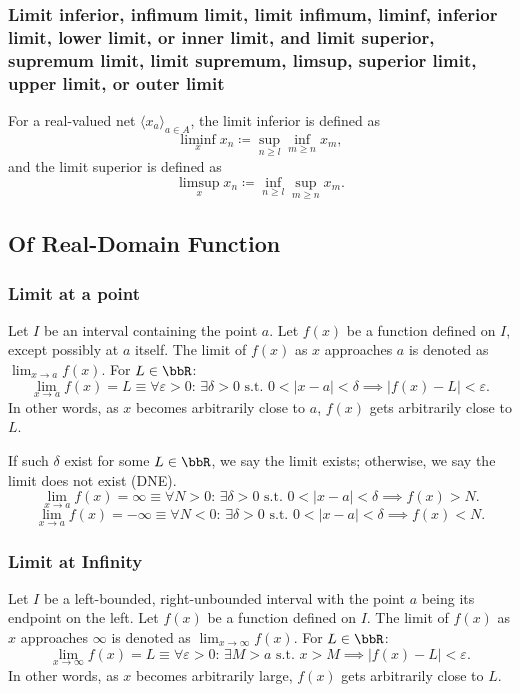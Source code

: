 \subsubsection{Limit inferior, infimum limit, limit infimum, liminf, inferior limit, lower limit, or inner limit, and limit superior, supremum limit, limit supremum, limsup, superior limit, upper limit, or outer limit}
For a real-valued net $\langle x_a\rangle_{a\in A}$, the limit inferior is defined as
\[\liminf_{x}x_n\coloneq\sup_{n\geq l}\inf_{m\geq n}x_m,\]
and the limit superior is defined as
\[\limsup_{x}x_n\coloneq\inf_{n\geq l}\sup_{m\geq n}x_m.\]
\subsection{Of Real-Domain Function}
\subsubsection{Limit at a point}
Let \(I\) be an interval containing the point \(a\). Let \( f(x) \) be a function defined on \(I\), except possibly at \(a\) itself. The limit of \( f(x) \) as \( x \) approaches \( a \) is denoted as $\lim_{x \to a} f(x)$. For $L\in\bbR$:
\[\lim_{x \to a} f(x) = L \equiv \forall \varepsilon > 0:\, \exists \delta > 0 \text{\ s.t.\ } 0 < |x - a| < \delta \implies |f(x) - L| < \varepsilon.\]
In other words, as \(x\) becomes arbitrarily close to \(a\), \(f(x)\) gets arbitrarily close to \(L\).

If such $\delta$ exist for some $L\in\bbR$, we say the limit exists; otherwise, we say the limit does not exist (DNE).
\[\lim_{x\to a}f(x)=\infty \equiv \forall N > 0:\, \exists \delta > 0 \text{\ s.t.\ } 0 < |x - a| < \delta \implies f(x) > N.\]
\[\lim_{x\to a}f(x)=-\infty \equiv \forall N < 0:\, \exists \delta > 0 \text{\ s.t.\ } 0 < |x - a| < \delta \implies f(x) < N.\]
\subsubsection{Limit at Infinity}
Let \(I\) be a left-bounded, right-unbounded interval with the point \(a\) being its endpoint on the left. Let \( f(x) \) be a function defined on \(I\). The limit of \( f(x) \) as \( x \) approaches \( \infty \) is denoted as $\lim_{x \to \infty} f(x)$. For $L\in\bbR$:
\[\lim_{x \to \infty} f(x) = L \equiv \forall \varepsilon > 0: \, \exists M > a \text{\ s.t.\ } x > M \implies |f(x) - L| < \varepsilon.\]
In other words, as \(x\) becomes arbitrarily large, \(f(x)\) gets arbitrarily close to \(L\).

